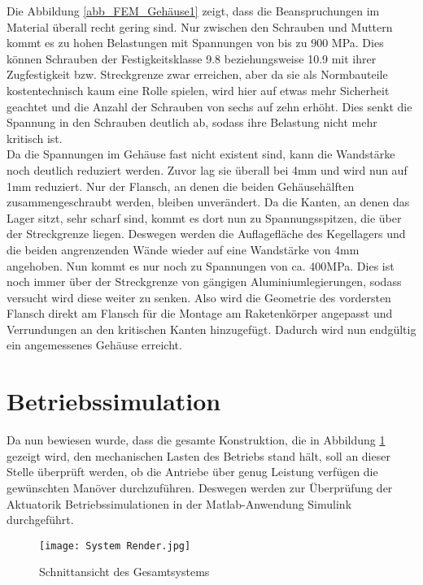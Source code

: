 Die Abbildung \ref{abb_FEM_Gehäuse1} zeigt, dass die Beanspruchungen im Material überall recht gering sind. Nur zwischen den Schrauben und Muttern kommt es zu hohen Belastungen mit Spannungen von bis zu $900$ MPa. Dies können Schrauben der Festigkeitsklasse 9.8 beziehungsweise 10.9 mit ihrer Zugfestigkeit bzw. Streckgrenze zwar erreichen, aber da sie als Normbauteile kostentechnisch kaum eine Rolle spielen, wird hier auf etwas mehr Sicherheit geachtet und die Anzahl der Schrauben von sechs auf zehn erhöht. Dies senkt die Spannung in den Schrauben deutlich ab, sodass ihre Belastung nicht mehr kritisch ist.\\
Da die Spannungen im Gehäuse fast nicht existent sind, kann die Wandstärke noch deutlich reduziert werden. Zuvor lag sie überall bei 4mm und wird nun auf 1mm reduziert. Nur der Flansch, an denen die beiden Gehäusehälften zusammengeschraubt werden, bleiben unverändert. Da die Kanten, an denen das Lager sitzt, sehr scharf sind, kommt es dort nun zu Spannungsspitzen, die über der Streckgrenze liegen. Deswegen werden die Auflagefläche des Kegellagers und die beiden angrenzenden Wände wieder auf eine Wandstärke von 4mm angehoben. Nun kommt es nur noch zu Spannungen von ca. 400MPa. Dies ist noch immer über der Streckgrenze von gängigen Aluminiumlegierungen, sodass versucht wird diese weiter zu senken. Also wird die Geometrie des vordersten Flansch direkt am Flansch für die Montage am Raketenkörper angepasst und Verrundungen an den kritischen Kanten hinzugefügt. Dadurch wird nun endgültig ein angemessenes Gehäuse erreicht.
\section{Betriebssimulation}\label{sec:betriebssim}
Da nun bewiesen wurde, dass die gesamte Konstruktion, die in Abbildung \ref{abb_gesamt_sys} gezeigt wird, den mechanischen Lasten des Betriebs stand hält, soll an dieser Stelle überprüft werden, ob die Antriebe über genug Leistung verfügen die gewünschten Manöver durchzuführen. Deswegen werden zur Überprüfung der Aktuatorik Betriebssimulationen in der Matlab-Anwendung Simulink durchgeführt.
\begin{figure}[h] 
	\centering
	\texttt{[image: System Render.jpg]}
	\caption{Schnittansicht des Gesamtsystems}
	\label{abb_gesamt_sys}
\end{figure}
